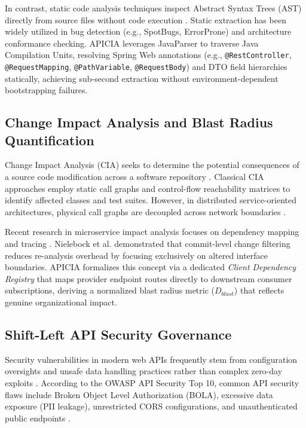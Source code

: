\documentclass[conference]{IEEEtran}
\begin{document}
In contrast, static code analysis techniques inspect Abstract Syntax Trees (AST) directly from source files without code execution \cite{murphy1996lightweight}. Static extraction has been widely utilized in bug detection (e.g., SpotBugs, ErrorProne) and architecture conformance checking. APICIA leverages JavaParser to traverse Java Compilation Units, resolving Spring Web annotations (e.g., \texttt{@RestController}, \texttt{@RequestMapping}, \texttt{@PathVariable}, \texttt{@RequestBody}) and DTO field hierarchies statically, achieving sub-second extraction without environment-dependent bootstrapping failures.

\subsection{Change Impact Analysis and Blast Radius Quantification}
Change Impact Analysis (CIA) seeks to determine the potential consequences of a source code modification across a software repository \cite{chen2020holistic}. Classical CIA approaches employ static call graphs and control-flow reachability matrices to identify affected classes and test suites. However, in distributed service-oriented architectures, physical call graphs are decoupled across network boundaries \cite{bogner2019microservices}. 

Recent research in microservice impact analysis focuses on dependency mapping and tracing \cite{decan2019empirical, nielebock2021guided}. Nielebock et al. \cite{nielebock2021guided} demonstrated that commit-level change filtering reduces re-analysis overhead by focusing exclusively on altered interface boundaries. APICIA formalizes this concept via a dedicated \textit{Client Dependency Registry} that maps provider endpoint routes directly to downstream consumer subscriptions, deriving a normalized blast radius metric ($D_{blast}$) that reflects genuine organizational impact.

\subsection{Shift-Left API Security Governance}
Security vulnerabilities in modern web APIs frequently stem from configuration oversights and unsafe data handling practices rather than complex zero-day exploits \cite{alshammari2022restsec, gallais2020api}. According to the OWASP API Security Top 10, common API security flaws include Broken Object Level Authorization (BOLA), excessive data exposure (PII leakage), unrestricted CORS configurations, and unauthenticated public endpoints \cite{mathijssen2020identification}. 
\end{document}
